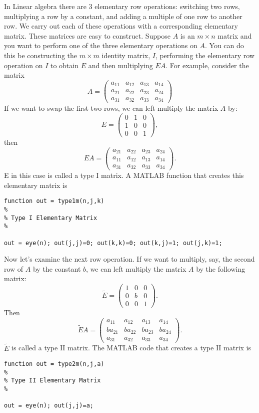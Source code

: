 

In Linear algebra there are 3 elementary row operations: switching two rows, multiplying a row by a constant, and adding a multiple of one row to another row.  We carry out each of these operations with a corresponding elementary matrix.  These matrices are easy to construct. Suppose $A$ is an $m \times n$ matrix and you want to perform one of the three elementary operations on $A$. You can do this be constructing the $m \times m$ identity matrix, $I$, performing the elementary row operation on $I$ to obtain $E$ and then multiplying $EA$.  For example, consider the matrix
\[
A = \begin{pmatrix}
a_{11}&a_{12}&a_{13}&a_{14}\\
a_{21}&a_{22}&a_{23}&a_{24}\\
a_{31}&a_{32}&a_{33}&a_{34}
\end{pmatrix}
\]
If we want to swap the first two rows, we can left multiply the
matrix $A$ by:
\[
E = \begin{pmatrix}
0&1&0\\
1&0&0\\
0&0&1
\end{pmatrix},
\]
then
\[
E A =
\begin{pmatrix}
a_{21}&a_{22}&a_{23}&a_{24}\\
a_{11}&a_{12}&a_{13}&a_{14}\\
a_{31}&a_{32}&a_{33}&a_{34}
\end{pmatrix}.
\]
E in this case is called a type I matrix.  A MATLAB function that creates this elementary matrix is

\begin{verbatim}
function out = type1m(n,j,k)
%
% Type I Elementary Matrix
%

out = eye(n); out(j,j)=0; out(k,k)=0; out(k,j)=1; out(j,k)=1;
\end{verbatim}

Now let's examine the next row operation.  If we want to multiply,
say, the second row of $A$ by the constant $b$, we can left multiply
the matrix $A$ by the following matrix:
\[
\tilde{E} = \begin{pmatrix}
1&0&0\\
0&b&0\\
0&0&1
\end{pmatrix}.
\]
Then
\[
\tilde{E} A =
\begin{pmatrix}
a_{11}&a_{12}&a_{13}&a_{14}\\
b a_{21}&b a_{22}&b a_{23}&b a_{24}\\
a_{31}&a_{32}&a_{33}&a_{34}
\end{pmatrix}.
\]
$\tilde{E}$ is called a type II matrix.  The MATLAB code that creates a type II matrix is
\begin{verbatim}
function out = type2m(n,j,a)
%
% Type II Elementary Matrix
%

out = eye(n); out(j,j)=a;
\end{verbatim}

